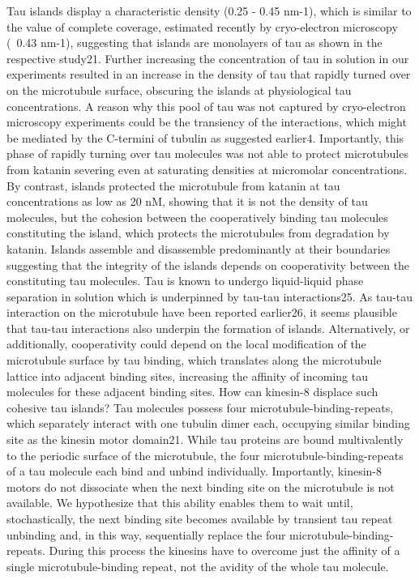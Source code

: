 Tau islands display a characteristic density (0.25 - 0.45 nm-1), which is similar to the value of complete coverage, estimated recently by cryo-electron microscopy (~0.43 nm-1), suggesting that islands are monolayers of tau as shown in the respective study21. Further increasing the concentration of tau in solution in our experiments resulted in an increase in the density of tau that rapidly turned over on the microtubule surface, obscuring the islands at physiological tau concentrations. A reason why this pool of tau was not captured by cryo-electron microscopy experiments could be the transiency of the interactions, which might be mediated by the C-termini of tubulin as suggested earlier4. Importantly, this phase of rapidly turning over tau molecules was not able to protect microtubules from katanin severing even at saturating densities at micromolar concentrations. By contrast, islands protected the microtubule from katanin at tau concentrations as low as 20 nM, showing that it is not the density of tau molecules, but the cohesion between the cooperatively binding tau molecules constituting the island, which protects the microtubules from degradation by katanin. 
Islands assemble and disassemble predominantly at their boundaries suggesting that the integrity of the islands depends on cooperativity between the constituting tau molecules. Tau is known to undergo liquid-liquid phase separation in solution which is underpinned by tau-tau interactions25. As tau-tau interaction on the microtubule have been reported earlier26, it seems plausible that tau-tau interactions also underpin the formation of islands. Alternatively, or additionally, cooperativity could depend on the local modification of the microtubule surface by tau binding, which translates along the microtubule lattice into adjacent binding sites, increasing the affinity of incoming tau molecules for these adjacent binding sites.	
How can kinesin-8 displace such cohesive tau islands? Tau molecules possess four microtubule-binding-repeats, which separately interact with one tubulin dimer each, occupying similar binding site as the kinesin motor domain21. While tau proteins are bound multivalently to the periodic surface of the microtubule, the four microtubule-binding-repeats of a tau molecule each bind and unbind individually. Importantly, kinesin-8 motors do not dissociate when the next binding site on the microtubule is not available. We hypothesize that this ability enables them to wait until, stochastically, the next binding site becomes available by transient tau repeat unbinding and, in this way, sequentially replace the four microtubule-binding-repeats. During this process the kinesins have to overcome just the affinity of a single microtubule-binding repeat, not the avidity of the whole tau molecule.
